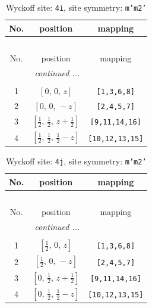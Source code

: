 \documentclass[fleqn,8pt]{jsarticle}
\begin{document}
\renewcommand{\arraystretch}{1.2}
\begin{longtable}{ccc}
\caption{Wyckoff site: {\tt 4i}, site symmetry: {\tt m'm2'}}
 \\
 \hline \hline
No. & position & mapping \\ \hline \endfirsthead

\multicolumn{2}{l}{\tablename\ \thetable{}} \\
 \hline \hline
No. & position & mapping \\ \hline \endhead

 \hline \hline
\multicolumn{2}{r}{\footnotesize\it continued ...} \\ \endfoot

 \hline \hline
\multicolumn{2}{r}{} \\ \endlastfoot

1 & $\left[ 0,\, 0,\, z \right]$ & {\tt [1,3,6,8]} \\ \hline
2 & $\left[ 0,\, 0,\, - z \right]$ & {\tt [2,4,5,7]} \\ \hline
3 & $\left[ \frac{1}{2},\, \frac{1}{2},\, z + \frac{1}{2} \right]$ & {\tt [9,11,14,16]} \\ \hline
4 & $\left[ \frac{1}{2},\, \frac{1}{2},\, \frac{1}{2} - z \right]$ & {\tt [10,12,13,15]} \\
\end{longtable}
\renewcommand{\arraystretch}{1.2}
\begin{longtable}{ccc}
\caption{Wyckoff site: {\tt 4j}, site symmetry: {\tt m'm2'}}
 \\
 \hline \hline
No. & position & mapping \\ \hline \endfirsthead

\multicolumn{2}{l}{\tablename\ \thetable{}} \\
 \hline \hline
No. & position & mapping \\ \hline \endhead

 \hline \hline
\multicolumn{2}{r}{\footnotesize\it continued ...} \\ \endfoot

 \hline \hline
\multicolumn{2}{r}{} \\ \endlastfoot

1 & $\left[ \frac{1}{2},\, 0,\, z \right]$ & {\tt [1,3,6,8]} \\ \hline
2 & $\left[ \frac{1}{2},\, 0,\, - z \right]$ & {\tt [2,4,5,7]} \\ \hline
3 & $\left[ 0,\, \frac{1}{2},\, z + \frac{1}{2} \right]$ & {\tt [9,11,14,16]} \\ \hline
4 & $\left[ 0,\, \frac{1}{2},\, \frac{1}{2} - z \right]$ & {\tt [10,12,13,15]} \\
\end{longtable}
\end{document}
